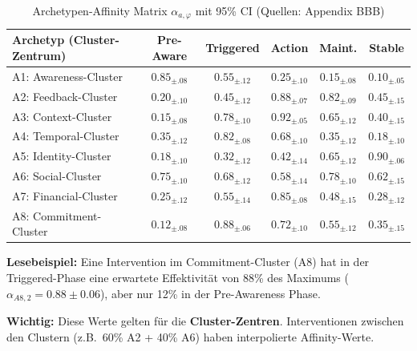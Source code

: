 \begin{table}[htbp]
\centering
\caption{Archetypen-Affinity Matrix $\alpha_{a,\varphi}$ mit 95\% CI (Quellen: Appendix BBB)}
\label{tab:18-affinity-matrix-full}
\renewcommand{\arraystretch}{1.3}
\footnotesize
\begin{tabular}{@{}lccccc@{}}
\toprule
\textbf{Archetyp (Cluster-Zentrum)} & \textbf{Pre-Aware} & \textbf{Triggered} & \textbf{Action} & \textbf{Maint.} & \textbf{Stable} \\
\midrule
A1: Awareness-Cluster & \cellcolor{green!25}$0.85_{\pm.08}$ & $0.55_{\pm.12}$ & $0.25_{\pm.10}$ & $0.15_{\pm.08}$ & $0.10_{\pm.05}$ \\
A2: Feedback-Cluster & $0.20_{\pm.10}$ & $0.45_{\pm.12}$ & \cellcolor{green!25}$0.88_{\pm.07}$ & \cellcolor{green!25}$0.82_{\pm.09}$ & $0.45_{\pm.15}$ \\
A3: Context-Cluster & $0.15_{\pm.08}$ & \cellcolor{green!25}$0.78_{\pm.10}$ & \cellcolor{green!25}$0.92_{\pm.05}$ & $0.65_{\pm.12}$ & $0.40_{\pm.15}$ \\
A4: Temporal-Cluster & $0.35_{\pm.12}$ & \cellcolor{green!25}$0.82_{\pm.08}$ & $0.68_{\pm.10}$ & $0.35_{\pm.12}$ & $0.18_{\pm.10}$ \\
A5: Identity-Cluster & $0.18_{\pm.10}$ & $0.32_{\pm.12}$ & $0.42_{\pm.14}$ & $0.65_{\pm.12}$ & \cellcolor{green!25}$0.90_{\pm.06}$ \\
A6: Social-Cluster & \cellcolor{green!25}$0.75_{\pm.10}$ & $0.68_{\pm.12}$ & $0.58_{\pm.14}$ & \cellcolor{green!25}$0.78_{\pm.10}$ & $0.62_{\pm.15}$ \\
A7: Financial-Cluster & $0.25_{\pm.12}$ & $0.55_{\pm.14}$ & \cellcolor{green!25}$0.85_{\pm.08}$ & $0.48_{\pm.15}$ & $0.28_{\pm.12}$ \\
A8: Commitment-Cluster & $0.12_{\pm.08}$ & \cellcolor{green!25}$0.88_{\pm.06}$ & $0.72_{\pm.10}$ & $0.55_{\pm.12}$ & $0.35_{\pm.15}$ \\
\bottomrule
\end{tabular}
\end{table}

\textbf{Lesebeispiel:} Eine Intervention im Commitment-Cluster (A8) hat in der Triggered-Phase eine erwartete Effektivit\"{a}t von 88\% des Maximums ($\alpha_{A8,2} = 0.88 \pm 0.06$), aber nur 12\% in der Pre-Awareness Phase.

\textbf{Wichtig:} Diese Werte gelten f\"{u}r die \textbf{Cluster-Zentren}. Interventionen zwischen den Clustern (z.B.\ 60\% A2 + 40\% A6) haben interpolierte Affinity-Werte.

